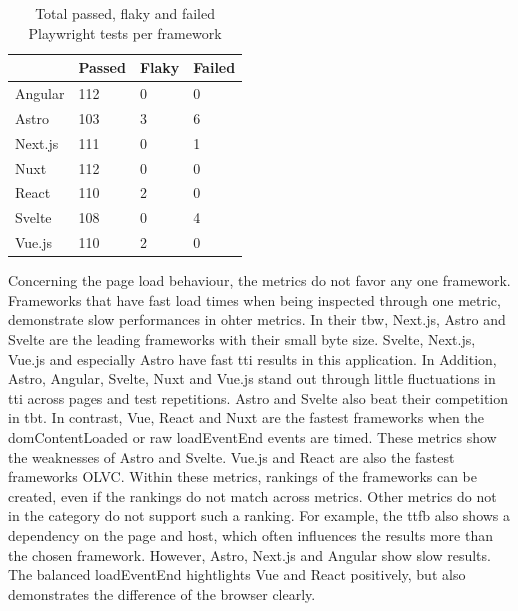\documentclass[a4paper, 10pt]{article}
\begin{document}
\begin{table}[!ht]
  \centering
  \begin{tabular}{|l|l|l|l|}
    \hline
    ~         & \textbf{Passed} & \textbf{Flaky}  & \textbf{Failed} \\ \hline
    Angular   & 112             & 0               & 0               \\ \hline
    Astro     & 103             & 3               & 6               \\ \hline
    Next.js   & 111             & 0               & 1               \\ \hline
    Nuxt      & 112             & 0               & 0               \\ \hline
    React     & 110             & 2               & 0               \\ \hline
    Svelte    & 108             & 0               & 4               \\ \hline
    Vue.js    & 110             & 2               & 0               \\ \hline
  \end{tabular}
  \caption{Total passed, flaky and failed Playwright tests per framework}
  \label{tab:playwright:total}
\end{table}

Concerning the page load behaviour, the metrics do not favor any one framework.
Frameworks that have fast load times when being inspected through one metric, demonstrate slow performances in ohter metrics.
In their \acrlong{tbw}, Next.js, Astro and Svelte are the leading frameworks with their small byte size.
Svelte, Next.js, Vue.js and especially Astro have fast \acrlong{tti} results in this application.
In Addition, Astro, Angular, Svelte, Nuxt and Vue.js stand out through little fluctuations in \acrshort{tti} across pages and test repetitions.
Astro and Svelte also beat their competition in \acrlong{tbt}.
In contrast, Vue, React and Nuxt are the fastest frameworks when the domContentLoaded or raw loadEventEnd events are timed.
These metrics show the weaknesses of Astro and Svelte.
Vue.js and React are also the fastest frameworks OLVC.
Within these metrics, rankings of the frameworks can be created, even if the rankings do not match across metrics.
Other metrics do not in the category do not support such a ranking.
For example, the \acrlong{ttfb} also shows a dependency on the page and host, which often influences the results more than the chosen framework.
However, Astro, Next.js and Angular show slow results.
The balanced loadEventEnd hightlights Vue and React positively, but also demonstrates the difference of the browser clearly.
\end{document}
